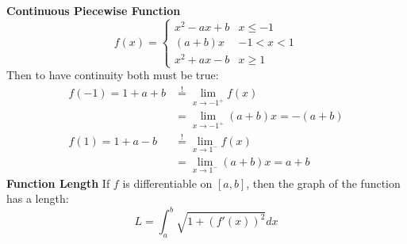 \documentclass[8pt,a4paper]{extarticle}     %
\theoremstyle{definition}
\theoremstyle{definition}
\theoremstyle{definition}
\begin{document}
\begin{multicols}{4}
\textbf{Continuous Piecewise Function} 
\[ f(x)=
	\begin{cases} 
		x^2-ax+b & x\leq -1 \\
		(a+b)x & -1<x<1 \\
		x^2+ax-b & x \geq 1 
	\end{cases}
\]
Then to have continuity both must be true: \\
\[
\begin{split}
	f(-1) = 1+a+b &\stackrel{!}{=} \lim_{x\to-1^+}f(x) \\
	&= \lim_{x\to-1^+}(a+b)x = -(a+b) \\ 
	f(1) = 1+a-b &\stackrel{!}{=} \lim_{x\to 1^-}f(x) \\
	&= \lim_{x\to 1^-}(a+b)x = a+b
\end{split}
\]  
\textbf{Function Length}
If $f$ is differentiable on $[a,b]$, then the graph of the function has a length: 
$$L = \int_a^{b} \sqrt{1+(f'(x))^2}dx$$


\vfill\eject
\columnbreak



\end{multicols}
\end{document}
